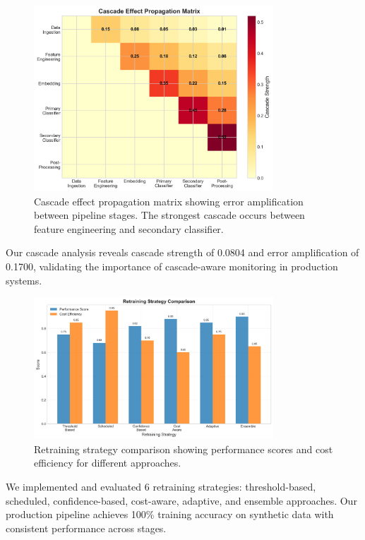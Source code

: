 \documentclass{article}
\begin{document}
\begin{figure}[h]
\centering
\includegraphics[width=0.8\textwidth]{media/cascade_heatmap.png}
\caption{Cascade effect propagation matrix showing error amplification between pipeline stages. The strongest cascade occurs between feature engineering and secondary classifier.}
\label{fig:cascade_heatmap}
\end{figure}

Our cascade analysis reveals cascade strength of 0.0804 and error amplification of 0.1700, validating the importance of cascade-aware monitoring in production systems.

\begin{figure}[h]
\centering
\includegraphics[width=0.8\textwidth]{media/retraining_strategies.png}
\caption{Retraining strategy comparison showing performance scores and cost efficiency for different approaches.}
\label{fig:retraining_strategies}
\end{figure}

We implemented and evaluated 6 retraining strategies: threshold-based, scheduled, confidence-based, cost-aware, adaptive, and ensemble approaches. Our production pipeline achieves 100\% training accuracy on synthetic data with consistent performance across stages.
\end{document}
